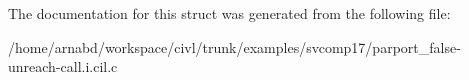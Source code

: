 The documentation for this struct was generated from the following file\+:\begin{DoxyCompactItemize}
\item 
/home/arnabd/workspace/civl/trunk/examples/svcomp17/parport\+\_\+false-\/unreach-\/call.\+i.\+cil.\+c\end{DoxyCompactItemize}
